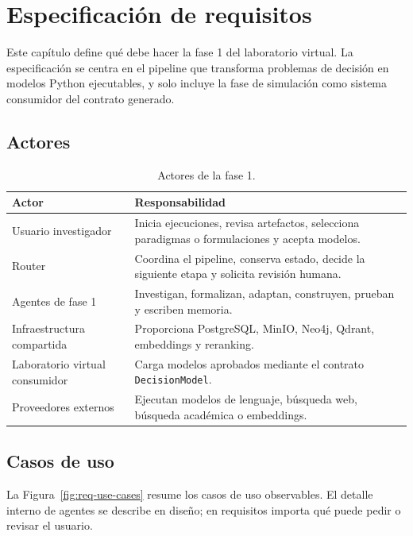 \chapter{Especificación de requisitos}

Este capítulo define qué debe hacer la fase 1 del laboratorio virtual. La
especificación se centra en el pipeline que transforma problemas de decisión en
modelos Python ejecutables, y solo incluye la fase de simulación como sistema
consumidor del contrato generado.

\section{Actores}

\begin{table}[H]
\begin{center}
\small
\begin{tabular}{|p{3.2cm}|p{9.3cm}|} \hline
\textbf{Actor} & \textbf{Responsabilidad} \\ \hline
Usuario investigador & Inicia ejecuciones, revisa artefactos, selecciona paradigmas o formulaciones y acepta modelos. \\ \hline
Router & Coordina el pipeline, conserva estado, decide la siguiente etapa y solicita revisión humana. \\ \hline
Agentes de fase 1 & Investigan, formalizan, adaptan, construyen, prueban y escriben memoria. \\ \hline
Infraestructura compartida & Proporciona PostgreSQL, MinIO, Neo4j, Qdrant, embeddings y reranking. \\ \hline
Laboratorio virtual consumidor & Carga modelos aprobados mediante el contrato \texttt{DecisionModel}. \\ \hline
Proveedores externos & Ejecutan modelos de lenguaje, búsqueda web, búsqueda académica o embeddings. \\ \hline
\end{tabular}
\caption{Actores de la fase 1.}
\end{center}
\end{table}

\section{Casos de uso}

La Figura~\ref{fig:req-use-cases} resume los casos de uso observables. El
detalle interno de agentes se describe en diseño; en requisitos importa qué
puede pedir o revisar el usuario.


